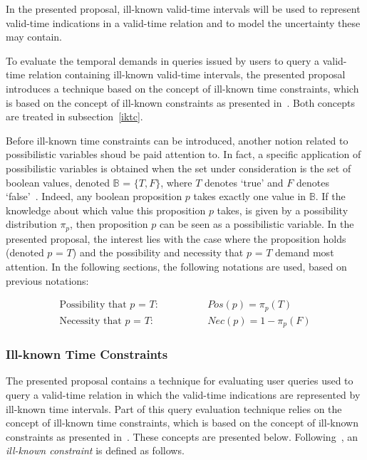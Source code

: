 
In the presented proposal, ill-known valid-time intervals will be used to represent valid-time indications in a valid-time relation and to model the uncertainty these may contain.

To evaluate the temporal demands in queries issued by users to query a valid-time relation containing ill-known valid-time intervals, the presented proposal introduces a technique based on the concept of ill-known time constraints, which is based on the concept of ill-known constraints as presented in~\cite{Pon11}. Both concepts are treated in subsection~\ref{iktc}.

Before ill-known time constraints can be introduced, another notion related to possibilistic variables shoud be paid attention to. In fact, a specific application of possibilistic variables is obtained when the set under consideration is the set of boolean values, denoted $\mathbb{B}$ = $\{T,F\}$, where $T$ denotes `true' and $F$ denotes `false'~\cite{Pon11}. Indeed, any boolean proposition $p$ takes exactly one value in $\mathbb{B}$. If the knowledge about which value this proposition $p$ takes, is given by a possibility distribution $\pi_p$, then proposition $p$ can be seen as a possibilistic variable. In the presented proposal, the interest lies with the case where the proposition holds (denoted $p$ = $T$) and the possibility and necessity that $p$ = $T$ demand most attention. In the following sections, the following notations are used, based on previous notations:

\begin{align}
\text{Possibility that $p$ = $T$:} \hspace{50pt} & Pos(p) = \pi_p(T) \\
\text{Necessity that $p$ = $T$:} \hspace{50pt} & Nec(p) = 1-\pi_p(F) 
\end{align}


\subsubsection{\label{iktc}Ill-known Time Constraints}
The presented proposal contains a technique for evaluating user queries used to query a valid-time relation in which the valid-time indications are represented by ill-known time intervals. Part of this query evaluation technique relies on the concept of ill-known time constraints, which is based on the concept of ill-known constraints as presented in~\cite{Pon11}. These concepts are presented below. Following~\cite{Pon11}, an \emph{ill-known constraint} is defined as follows.

